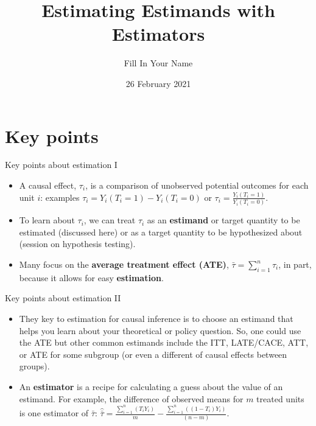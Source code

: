 \documentclass[
  ignorenonframetext,
]{beamer}
\title{Estimating Estimands with Estimators}
\author{Fill In Your Name}
\date{26 February 2021}
\begin{document}
\frame{\titlepage}

\begin{frame}[allowframebreaks]
  \tableofcontents[hideallsubsections]
\end{frame}
\hypertarget{key-points}{%
\section{Key points}\label{key-points}}

\begin{frame}{Key points about estimation I}
\protect\hypertarget{key-points-about-estimation-i}{}
\begin{itemize}
\item
  A causal effect, \(\tau_i\), is a comparison of unobserved potential
  outcomes for each unit \(i\): examples
  \(\tau_{i} = Y_{i}(T_{i}=1) - Y_{i}(T_{i}=0)\) or
  \(\tau_{i} = \frac{Y_{i}(T_{i}=1)}{ Y_{i}(T_{i}=0)}\).
\item
  To learn about \(\tau_{i}\), we can treat \(\tau_{i}\) as an
  \textbf{estimand} or target quantity to be estimated (discussed here)
  or as a target quantity to be hypothesized about (session on
  hypothesis testing).
\item
  Many focus on the \textbf{average treatment effect (ATE)},
  \(\bar{\tau}=\sum_{i=1}^n\tau_{i}\), in part, because it allows for
  easy \textbf{estimation}.
\end{itemize}
\end{frame}

\begin{frame}{Key points about estimation II}
\protect\hypertarget{key-points-about-estimation-ii}{}
\begin{itemize}
\item
  They key to estimation for causal inference is to choose an estimand
  that helps you learn about your theoretical or policy question. So,
  one could use the ATE but other common estimands include the ITT,
  LATE/CACE, ATT, or ATE for some subgroup (or even a different of
  causal effects between groups).
\item
  An \textbf{estimator} is a recipe for calculating a guess about the
  value of an estimand. For example, the difference of observed means
  for \(m\) treated units is one estimator of \(\bar{\tau}\):
  \(\hat{\bar{\tau}} = \frac{\sum_{i=1}^n (T_i Y_i)}{m} - \frac{\sum_{i=1}^n ( ( 1 - T_i)Y_i)}{(n-m)}\).
\end{itemize}
\end{frame}
\end{document}
